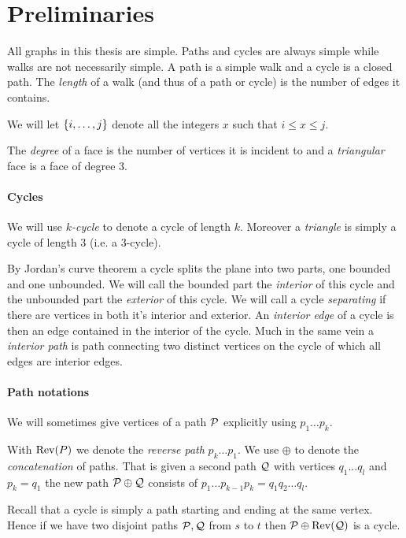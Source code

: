 
\section{Preliminaries}
All graphs in this thesis are simple. Paths and cycles are always simple while walks are not necessarily simple. A path is a simple walk and a cycle is a closed path.
The \emph{length} of a walk (and thus of a path or cycle) is the number of edges it contains.

We will let $\braces {i, \ldots, j}$ denote all the integers $x$ such that $i \leq x \leq j$.

The \emph{degree} of a face is the number of vertices it is incident to and a \emph{triangular} face is a face of degree $3$.

\paragraph{Cycles}
 We will use \emph{$k$-cycle} to denote a cycle of length $k$. Moreover a \emph{triangle} is simply a cycle of length $3$ (i.e. a $3$-cycle).

By Jordan's curve theorem a cycle splits the plane into two parts, one bounded and one unbounded. We will call the bounded part the \emph{interior} of this cycle and the unbounded part the \emph{exterior} of this cycle.
We will call a cycle \emph{separating} if there are vertices in both it's interior and exterior.
An \emph{interior edge} of a cycle is then an edge contained in the interior of the cycle. Much in the same vein a \emph{interior path} is path connecting two distinct vertices on the cycle of which all edges are interior edges.

\paragraph{Path notations}
  We will sometimes give vertices of a path $\P$ explicitly using $p_1 \ldots p_k$.

  With $\rev(P)$ we denote the \emph{reverse path} $p_k \ldots p_1$. We use $\oplus$ to denote the \emph{concatenation} of paths. That is given a second path $\Q$ with vertices $q_1 \ldots q_l$ and $p_k = q_1$ the new path $\P \oplus \Q$ consists of $p_1 \ldots p_{k-1} p_k=q_1 q_2 \ldots q_l$.

  Recall that a cycle is simply a path starting and ending at the same vertex. Hence if we have two disjoint paths $\P, \Q$ from $s$ to $t$ then $\P \oplus \rev(\Q)$ is a cycle.


